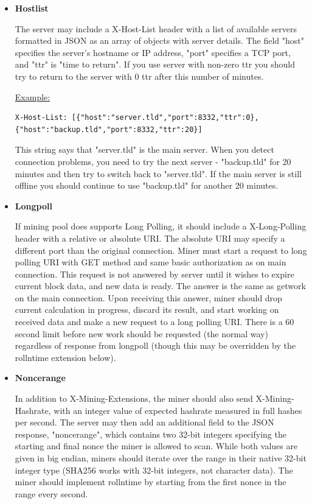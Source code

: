 \begin{itemize}
\item 
\textbf{Hostlist} 

The server may include a X-Host-List header with a list of available servers formatted in JSON as an array of objects with server details. The field "host" specifies the server's hostname or IP address, "port" specifies a TCP port, and "ttr" is "time to return". If you use server with non-zero ttr you should try to return to the server with 0 ttr after this number of minutes. 

\underline{Example:} 
\begin{verbatim}
X-Host-List: [{"host":"server.tld","port":8332,"ttr":0},
{"host":"backup.tld","port":8332,"ttr":20}]
\end{verbatim}


This string says that "server.tld" is the main server. When you detect connection problems, you need to try the next server - "backup.tld" for 20 minutes and then try to switch back to "server.tld". If the main server is still offline you should continue to use "backup.tld" for another 20 minutes.

\item 
\textbf{Longpoll}\label{sec:longpolling}

If mining pool does supports Long Polling, it should include a X-Long-Polling header with a relative or absolute URI. The absolute URI may specify a different port than the original connection. Miner must start a request to long polling URI with GET method and same basic authorization as on main connection. This request is not answered by server until it wishes to expire current block data, and new data is ready. The answer is the same as getwork on the main connection. Upon receiving this answer, miner should drop current calculation in progress, discard its result, and start working on received data and make a new request to a long polling URI. There is a 60 second limit before new work should be requested (the normal way) regardless of response from longpoll (though this may be overridden by the rollntime extension below).

\item 
\textbf{Noncerange} 

In addition to X-Mining-Extensions, the miner should also send X-Mining-Hashrate, with an integer value of expected hashrate measured in full hashes per second. The server may then add an additional field to the JSON response, "noncerange", which contains two 32-bit integers specifying the starting and final nonce the miner is allowed to scan. While both values are given in big endian, miners should iterate over the range in their native 32-bit integer type (SHA256 works with 32-bit integers, not character data). The miner should implement rollntime by starting from the first nonce in the range every second.


\end{itemize}
